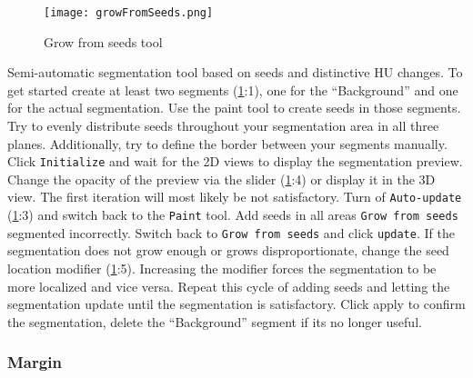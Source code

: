 \begin{figure}[h!]
	\centerline{
		\texttt{[image: growFromSeeds.png]}}
	\caption{Grow from seeds tool}\label{fig:gfs}
\end{figure}
\noindent
Semi-automatic segmentation tool based on seeds and distinctive HU changes.
To get started create at least two segments (\cref{fig:gfs}:1), one for the ``Background'' and one for the actual segmentation.
Use the paint tool to create seeds in those segments.
Try to evenly distribute seeds throughout your segmentation area in all three planes.
Additionally, try to define the border between your segments manually.
Click \texttt{Initialize} and wait for the 2D views to display the segmentation preview.
Change the opacity of the preview via the slider (\cref{fig:gfs}:4) or display it in the 3D view.
The first iteration will most likely be not satisfactory.
Turn of \texttt{Auto-update} (\cref{fig:gfs}:3) and switch back to the \texttt{Paint} tool.
Add seeds in all areas \texttt{Grow from seeds} segmented incorrectly.
Switch back to \texttt{Grow from seeds} and click \texttt{update}.
If the segmentation does not grow enough or grows disproportionate, change the seed location modifier (\cref{fig:gfs}:5).
Increasing the modifier forces the segmentation to be more localized and vice versa.
Repeat this cycle of adding seeds and letting the segmentation update until the segmentation is satisfactory.
Click apply to confirm the segmentation, delete the ``Background'' segment if its no longer useful.


\subsubsection{Margin}\label{section:margin}
\begin{figure}[h]
	\begin{subfigure}{0.2\textwidth}
		
	\end{subfigure}
\end{figure}


